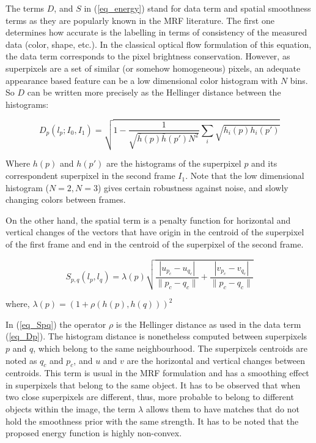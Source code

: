 The terms $D$, and $S$ in (\ref{eq_energy}) stand for data term and spatial smoothness terms as they
are popularly known in the MRF literature. The first one determines how accurate is the labelling in terms
of consistency of the measured data (color, shape, etc.). In the classical optical flow formulation of this equation,
the data term corresponds to the pixel brightness conservation\cite{c7}\cite{c5}. However, as superpixels are a set
of similar (or somehow homogeneous) pixels, an adequate appearance based feature can be a low dimensional
color histogram with $N$ bins. So $D$ can be written more precisely as the Hellinger distance between the histograms:

\begin{equation}
D_p(l_p;I_0,I_1) = \sqrt{ 1 - \frac{1}{\sqrt{\bar{h}(p)\bar{h}(p')N^2} } \sum_{i}\sqrt{h_{i}(p)h_{i}(p')} }
\label{eq_Dp}
\end{equation}

Where $h(p)$ and $h(p')$ are the histograms of the superpixel $p$ and its correspondent superpixel in the
second frame $I_1$. 
Note that the low dimensional histogram ($N=2, N=3$) gives certain robustness against noise,
and slowly changing colors between frames. 

On the other hand, the spatial term is a penalty function for horizontal
and vertical changes of the vectors that have origin in the centroid of the superpixel of the first frame and
end in the centroid of the superpixel of the second frame.

\begin{equation}
S_{p,q}(l_p, l_q) = \lambda(p)
  \sqrt{\frac{|u_{p_c}-u_{q_c}|}{\|p_c-q_c\|}+ \frac{|v_{p_c}-v_{q_c}|}{\|p_c-q_c\|}}
\label{eq_Spq}
\end{equation}
\begin{center}
 where, $ \lambda(p) = (1 + \rho(h(p),h(q)))^2 $ \\
\end{center}

In (\ref{eq_Spq}) the operator $\rho$ is the Hellinger distance as used in the
data term (\ref{eq_Dp}). The histogram distance is nonetheless computed between superpixels $p$ and $q$, 
which belong to the same neighbourhood. The superpixels centroids are noted as $q_c$ and $p_c$, 
and $u$ and $v$ are the horizontal and vertical changes between centroids.
This term is usual in the MRF formulation and has a smoothing effect in superpixels that belong to the
same object. It has to be observed that when two close superpixels are different, thus, more probable to
belong to different objects within the image, the term $\lambda$ allows them to have
matches that do not hold the smoothness prior with the same strength. 
It has to be noted that the proposed energy function is highly non-convex.

